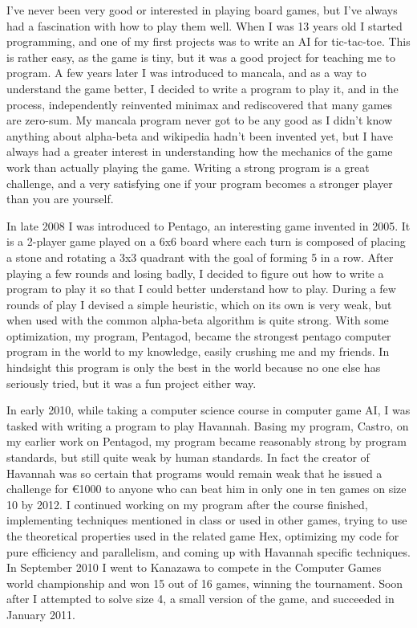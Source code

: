 

I've never been very good or interested in playing board games, but I've always had a fascination with how to play them well. When I was 13 years old I started programming, and one of my first projects was to write an AI for tic-tac-toe. This is rather easy, as the game is tiny, but it was a good project for teaching me to program. A few years later I was introduced to mancala, and as a way to understand the game better, I decided to write a program to play it, and in the process, independently reinvented minimax and rediscovered that many games are zero-sum. My mancala program never got to be any good as I didn't know anything about alpha-beta and wikipedia hadn't been invented yet, but I have always had a greater interest in understanding how the mechanics of the game work than actually playing the game. Writing a strong program is a great challenge, and a very satisfying one if your program becomes a stronger player than you are yourself.

In late 2008 I was introduced to Pentago, an interesting game invented in 2005. It is a 2-player game played on a 6x6 board where each turn is composed of placing a stone and rotating a 3x3 quadrant with the goal of forming 5 in a row. After playing a few rounds and losing badly, I decided to figure out how to write a program to play it so that I could better understand how to play. During a few rounds of play I devised a simple heuristic, which on its own is very weak, but when used with the common alpha-beta algorithm is quite strong. With some optimization, my program, Pentagod, became the strongest pentago computer program in the world to my knowledge, easily crushing me and my friends. In hindsight this program is only the best in the world because no one else has seriously tried, but it was a fun project either way.

In early 2010, while taking a computer science course in computer game AI, I was tasked with writing a program to play Havannah. Basing my program, Castro, on my earlier work on Pentagod, my program became reasonably strong by program standards, but still quite weak by human standards. In fact the creator of Havannah was so certain that programs would remain weak that he issued a challenge for \euro 1000 to anyone who can beat him in only one in ten games on size 10 by 2012. I continued working on my program after the course finished, implementing techniques mentioned in class or used in other games, trying to use the theoretical properties used in the related game Hex, optimizing my code for pure efficiency and parallelism, and coming up with Havannah specific techniques. In September 2010 I went to Kanazawa to compete in the Computer Games world championship and won 15 out of 16 games, winning the tournament. Soon after I attempted to solve size 4, a small version of the game, and succeeded in January 2011. 

